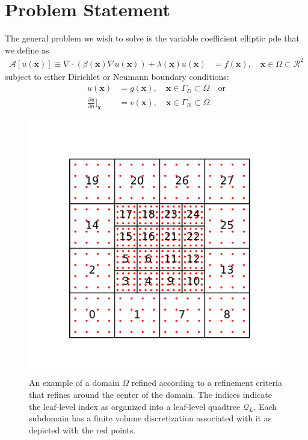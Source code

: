 \section{Problem Statement}
\label{sec:problem-statement}

The general problem we wish to solve is the variable coefficient elliptic \gls{pde} that we define as
\begin{align}
    \label{eq:elliptic-pde}
    \mathcal{A}[u(\textbf{x})] \equiv \nabla \cdot \left( \beta(\textbf{x}) \nabla u(\textbf{x}) \right) + \lambda(\textbf{x}) u(\textbf{x}) &= f(\textbf{x}), \quad \textbf{x} \in \Omega \subset \mathcal{R}^2
\end{align}
subject to either Dirichlet or Neumann boundary conditions:
\begin{align}
    \label{eq:elliptic-pde-bc1}
    u(\textbf{x}) &= g(\textbf{x}), \quad \textbf{x} \in \Gamma_D \subset \Omega \quad \mbox{or}\\
    \label{eq:elliptic-pde-bc2}
    \frac{\partial u}{\partial n} \Big|_{\textbf{x}} &= v(\textbf{x}), \quad \textbf{x} \in \Gamma_N \subset \Omega.
\end{align}

\begin{figure}
    \centering
    \includegraphics[width=\textwidth, clip=true, trim={0 160 0 160}]{figures/adaptive-mesh-serial.pdf}
    \caption{An example of a domain $\Omega$ refined according to a refinement criteria that refines around the center of the domain. The indices indicate the leaf-level index as organized into a leaf-level quadtree $\mathcal{Q}_L$. Each subdomain has a finite volume discretization associated with it as depicted with the red points.}
    \label{fig:adaptive-mesh-serial}
\end{figure}

